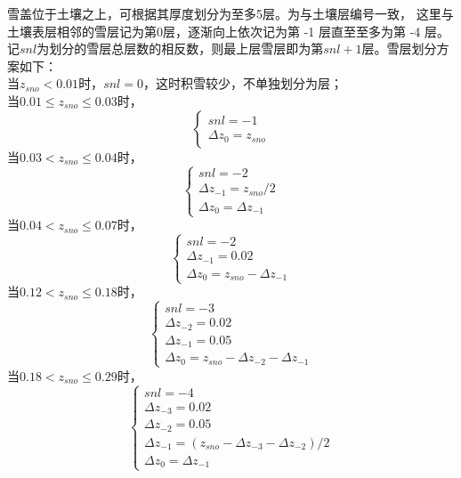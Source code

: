 雪盖位于土壤之上，可根据其厚度划分为至多5层。为与土壤层编号一致，
这里与土壤表层相邻的雪层记为第0层，逐渐向上依次记为第 -1 层直至至多为第 -4 层。
记$snl$为划分的雪层总层数的相反数，则最上层雪层即为第$snl+1$层。雪层划分方案如下：\\
当$z_{sno}<0.01$时，$snl=0$，这时积雪较少，不单独划分为层；\\
当$0.01\le z_{sno}\le0.03$时，\\
\begin{equation}
\left\{\begin{array}{c}s n l=-1 \\ \Delta z_{0}=z_{sno}\end{array}\right.
\end{equation}
当$0.03<z_{sno}\le0.04$时，
\begin{equation}
\left\{\begin{array}{c}s n l=-2 \\ \Delta z_{-1}=z_{sno} / 2 \\ \Delta z_{0}=\Delta z_{-1}\end{array}\right.
\end{equation}
当$0.04<z_{sno}\le0.07$时，
\begin{equation}
\left\{\begin{array}{c}s n l=-2 \\ \Delta z_{-1}=0.02 \\ \Delta z_{0}=z_{sno}-\Delta z_{-1}\end{array}\right.
\end{equation}
当$0.12<z_{sno}\le0.18$时，
\begin{equation}
\left\{\begin{array}{c}s n l=-3 \\ \Delta z_{-2}=0.02 \\ \Delta z_{-1}=0.05 \\ \Delta z_{0}=z_{sno}-\Delta z_{-2}-\Delta z_{-1}\end{array}\right.
\end{equation}
当$0.18<z_{sno}\le0.29$时，
\begin{equation}
\left\{\begin{array}{c}s n l=-4 \\ \Delta z_{-3}=0.02 \\ \Delta z_{-2}=0.05 \\ \Delta z_{-1}=\left(z_{sno}-\Delta z_{-3}-\Delta z_{-2}\right) / 2 \\ \Delta z_{0}=\Delta z_{-1}\end{array}\right.
\end{equation}
